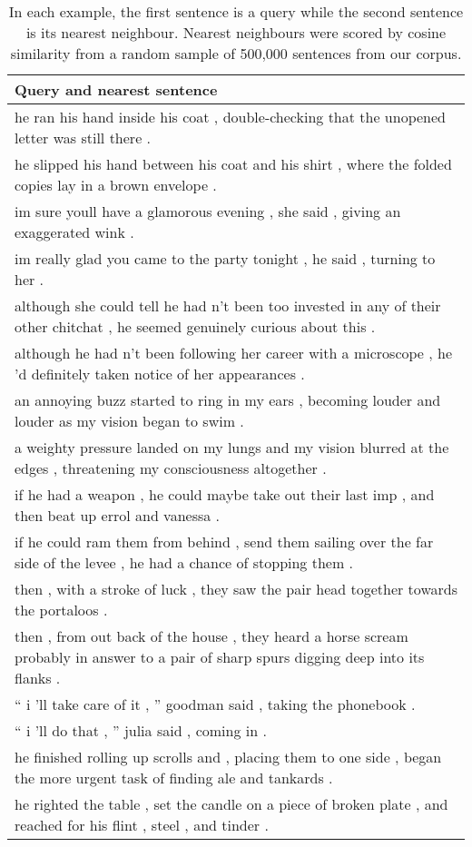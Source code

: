 \documentclass{article} \usepackage{nips15submit_e,times}
\begin{document}
\begin{table}
\scriptsize
\centering
\begin{tabular}{l}
\toprule \bf Query and nearest sentence \\ \midrule
he ran his hand inside his coat , double-checking that the unopened letter was still there . \\
he slipped his hand between his coat and his shirt , where the folded copies lay in a brown envelope . \\ \midrule
im sure youll have a glamorous evening , she said , giving an exaggerated wink . \\
im really glad you came to the party tonight , he said , turning to her . \\ \midrule
although she could tell he had n't been too invested in any of their other chitchat , he seemed genuinely curious about this . \\
although he had n't been following her career with a microscope , he 'd definitely taken notice of her appearances . \\ \midrule
an annoying buzz started to ring in my ears , becoming louder and louder as my vision began to swim . \\
a weighty pressure landed on my lungs and my vision blurred at the edges , threatening my consciousness altogether . \\ \midrule
if he had a weapon , he could maybe take out their last imp , and then beat up errol and vanessa . \\
if he could ram them from behind , send them sailing over the far side of the levee , he had a chance of stopping them . \\ \midrule
then , with a stroke of luck , they saw the pair head together towards the portaloos . \\
then , from out back of the house , they heard a horse scream probably in answer to a pair of sharp spurs digging deep into its flanks . \\ \midrule
`` i 'll take care of it , '' goodman said , taking the phonebook . \\
`` i 'll do that , '' julia said , coming in . \\ \midrule
he finished rolling up scrolls and , placing them to one side , began the more urgent task of finding ale and tankards . \\
he righted the table , set the candle on a piece of broken plate , and reached for his flint , steel , and tinder . \\ \bottomrule

\end{tabular}
\caption{In each example, the first sentence is a query while the second sentence is its nearest neighbour. Nearest neighbours were scored by cosine similarity from a random sample of 500,000 sentences from our corpus.}
\label{tab:nearest}
\end{table}
\end{document}
